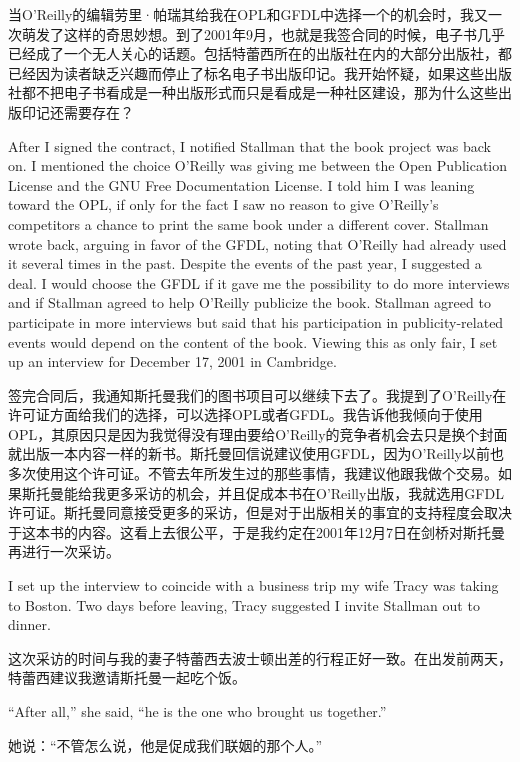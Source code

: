 \ifdefined\chs
当O'Reilly的编辑劳里·帕瑞其给我在OPL和GFDL中选择一个的机会时，我又一次萌发了这样的奇思妙想。到了2001年9月，也就是我签合同的时候，电子书几乎已经成了一个无人关心的话题。包括特蕾西所在的出版社在内的大部分出版社，都已经因为读者缺乏兴趣而停止了标名电子书出版印记。我开始怀疑，如果这些出版社都不把电子书看成是一种出版形式而只是看成是一种社区建设，那为什么这些出版印记还需要存在？
\fi

\ifdefined\eng
After I signed the contract, I notified Stallman that the book project was back on. I mentioned the choice O'Reilly was giving me between the Open Publication License and the GNU Free Documentation License. I told him I was leaning toward the OPL, if only for the fact I saw no reason to give O'Reilly's competitors a chance to print the same book under a different cover. Stallman wrote back, arguing in favor of the GFDL, noting that O'Reilly had already used it several times in the past. Despite the events of the past year, I suggested a deal. I would choose the GFDL if it gave me the possibility to do more interviews and if Stallman agreed to help O'Reilly publicize the book. Stallman agreed to participate in more interviews but said that his participation in publicity-related events would depend on the content of the book. Viewing this as only fair, I set up an interview for December 17, 2001 in Cambridge.
\fi

\ifdefined\chs
签完合同后，我通知斯托曼我们的图书项目可以继续下去了。我提到了O'Reilly在许可证方面给我们的选择，可以选择OPL或者GFDL。我告诉他我倾向于使用OPL，其原因只是因为我觉得没有理由要给O'Reilly的竞争者机会去只是换个封面就出版一本内容一样的新书。斯托曼回信说建议使用GFDL，因为O'Reilly以前也多次使用这个许可证。不管去年所发生过的那些事情，我建议他跟我做个交易。如果斯托曼能给我更多采访的机会，并且促成本书在O'Reilly出版，我就选用GFDL许可证。斯托曼同意接受更多的采访，但是对于出版相关的事宜的支持程度会取决于这本书的内容。这看上去很公平，于是我约定在2001年12月7日在剑桥对斯托曼再进行一次采访。
\fi

\ifdefined\eng
I set up the interview to coincide with a business trip my wife Tracy was taking to Boston. Two days before leaving, Tracy suggested I invite Stallman out to dinner.
\fi

\ifdefined\chs
这次采访的时间与我的妻子特蕾西去波士顿出差的行程正好一致。在出发前两天，特蕾西建议我邀请斯托曼一起吃个饭。
\fi

\ifdefined\eng
``After all,'' she said, ``he is the one who brought us together.''
\fi

\ifdefined\chs
她说：“不管怎么说，他是促成我们联姻的那个人。”
\fi

